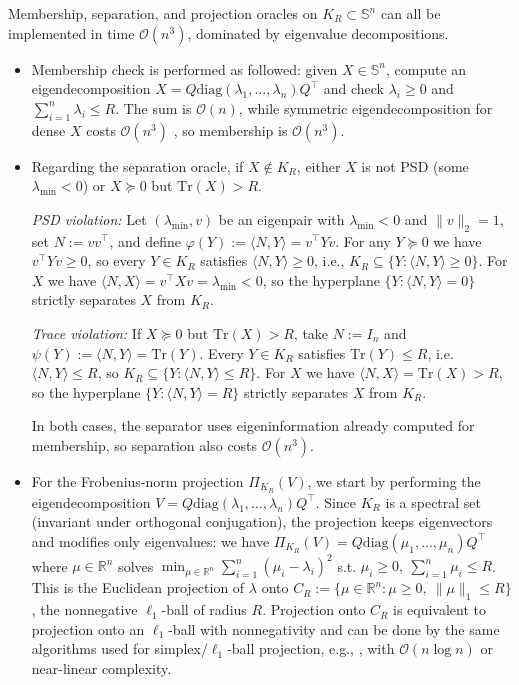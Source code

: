 \documentclass[11pt,letterpaper]{article}
\begin{document}
Membership, separation, and projection oracles on $K_R\subset\mathbb{S}^n$ can all be implemented in time $\mathcal{O}(n^3)$, dominated by eigenvalue decompositions.

\begin{itemize}
  \item 
 Membership check is performed as followed: given $X \in \mathbb{S}^n$, compute an eigendecomposition $X = Q  \mathrm{diag}(\lambda_1,\dots,\lambda_n) Q^\top$ and check $\lambda_i \ge 0$ and $\sum_{i=1}^n \lambda_i \le R$.
  The sum is $\mathcal{O}(n)$, while symmetric eigendecomposition for dense $X$ costs $\mathcal{O}(n^3)$ \cite{trefethen2022numerical}, so membership is $\mathcal{O}(n^3)$.  

  \item  Regarding the separation oracle, 
  if $X \notin K_R$, either $X$ is not PSD (some $\lambda_{\min}<0$) or $X \succeq 0$ but $\mathrm{Tr}(X) > R$.

  \emph{PSD violation:}
  Let $(\lambda_{\min},v)$ be an eigenpair with $\lambda_{\min}<0$ and $\|v\|_2=1$, set $N := v v^\top$, and define $\varphi(Y) := \langle N,Y\rangle = v^\top Y v$.
  For any $Y \succeq 0$ we have $v^\top Y v \ge 0$, so every $Y \in K_R$ satisfies $\langle N,Y\rangle \ge 0$, i.e., $K_R \subseteq \{Y : \langle N,Y\rangle \ge 0\}$.
  For $X$ we have $\langle N,X\rangle = v^\top X v = \lambda_{\min} < 0$, so the hyperplane $\{ Y : \langle N,Y\rangle = 0 \}$ strictly separates $X$ from $K_R$.

  \emph{Trace violation:}
  If $X \succeq 0$ but $\mathrm{Tr}(X) > R$, take $N := I_n$ and $\psi(Y) := \langle N,Y\rangle = \mathrm{Tr}(Y)$.
  Every $Y \in K_R$ satisfies $\mathrm{Tr}(Y) \le R$, i.e.\ $\langle N,Y\rangle \le R$, so $K_R \subseteq \{Y : \langle N,Y\rangle \le R\}$.
  For $X$ we have $\langle N,X\rangle = \mathrm{Tr}(X) > R$, so the hyperplane $\{ Y : \langle N,Y\rangle = R \}$ strictly separates $X$ from $K_R$.

  In both cases, the separator uses eigeninformation already computed for membership, so separation also costs $\mathcal{O}(n^3)$.

  \item 
  For the Frobenius-norm projection $\Pi_{K_R}(V)$, we start by performing the eigendecomposition $V = Q  \mathrm{diag}(\lambda_1,\dots,\lambda_n) Q^\top$.
  Since $K_R$ is a spectral set (invariant under orthogonal conjugation), the projection keeps eigenvectors and modifies only eigenvalues: we have $\Pi_{K_R}(V) = Q \mathrm{diag}(\mu_1,\dots,\mu_n) Q^\top$
  where $\mu \in \mathbb{R}^n$ solves $ \min_{\mu \in \mathbb{R}^n} \sum_{i=1}^n (\mu_i - \lambda_i)^2$ s.t. $ \mu_i \ge 0,\ \sum_{i=1}^n \mu_i \le R$. This is the Euclidean projection of $\lambda$ onto $C_R := \{\mu \in \mathbb{R}^n : \mu \ge 0,\ \|\mu\|_1 \le R\}$, the nonnegative $\ell_1$-ball of radius $R$.
  Projection onto $C_R$ is equivalent to projection onto an $\ell_1$-ball with nonnegativity and can be done by the same algorithms used for simplex/$\ell_1$-ball projection, e.g., \cite{Duchi2008,Condat2015}, with $\mathcal{O}(n\log n)$ or near-linear complexity.


\end{itemize}
\end{document}

